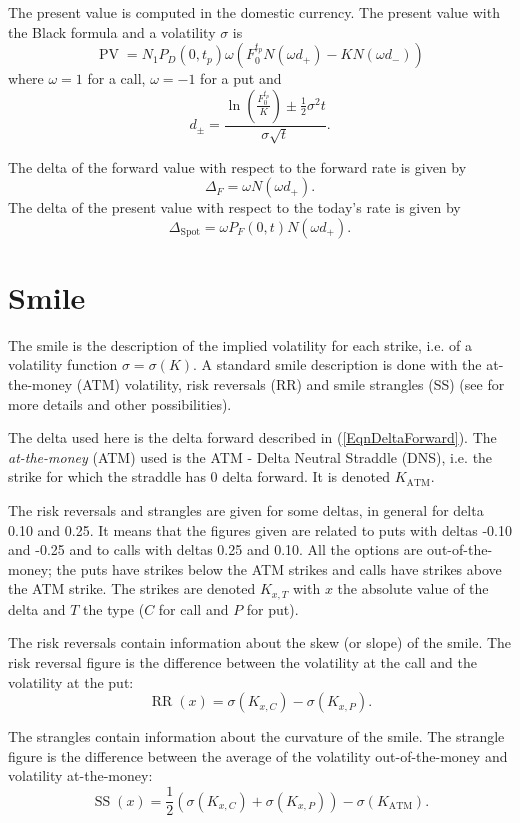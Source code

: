 \documentclass[]{amsart}
\newcommand{\spot}{{\operatorname{Spot}}}
\newcommand{\pv}{{\operatorname{PV}}}
\newcommand{\rr}{{\operatorname{RR}}}
\newcommand{\str}{{\operatorname{SS}}}
\newcommand{\atm}{{\operatorname{ATM}}}
\begin{document}
The present value is computed in the domestic currency.
The present value with the Black formula and a volatility $\sigma$ is
\[
\pv = N_1 P_D(0,t_p) \omega \left( F^{t_p}_0 N(\omega d_+) - K N(\omega d_-)\right)
\]
where $\omega = 1$ for a call, $\omega = -1$ for a put and 
\[
d_{\pm} = \frac{\ln\left(\frac{F^{t_p}_0}{K}\right) \pm \frac12 \sigma^2 t}{ \sigma \sqrt{t}}.
\]

The delta of the forward value with respect to the forward rate is given by
\begin{equation}
\label{EqnDeltaForward}
\Delta_F = \omega N(\omega d_+).
\end{equation}
The delta of the present value with respect to the today's rate is given by
\[
\Delta_\spot = \omega P_F(0,t) N(\omega d_+).
\]

\section{Smile}

The smile is the description of the implied volatility for each strike, i.e. of a volatility function $\sigma = \sigma(K)$.
A standard smile description is done with the at-the-money (ATM) volatility, risk reversals (RR) and smile strangles (SS) (see \cite{CLA.2011.1} for more details and other possibilities).

The delta used here is the delta forward described in (\ref{EqnDeltaForward}).
The \emph{at-the-money} (ATM) used is the ATM - Delta Neutral Straddle (DNS), i.e. the strike for which the straddle has 0 delta forward. It is denoted $K_\atm$.

The risk reversals and strangles are given for some deltas, in general for delta 0.10 and 0.25. It means that the figures given are related to puts with deltas -0.10 and -0.25 and to calls with deltas 0.25 and 0.10. All the options are out-of-the-money; the puts have strikes below the ATM strikes and calls have strikes above the ATM strike. The strikes are denoted $K_{x,T}$ with $x$ the absolute value of the delta and $T$ the type ($C$ for call and $P$ for put).

The risk reversals contain information about the skew (or slope) of the smile. The risk reversal figure is the difference between the volatility at the call and the volatility at the put:
\[
\rr(x) = \sigma(K_{x,C}) - \sigma(K_{x,P}).
\]

The strangles contain information about the curvature of the smile. The strangle figure is the difference between the average of the volatility out-of-the-money and volatility at-the-money:
\[
\str(x) = \frac12 \left(\sigma(K_{x,C}) + \sigma(K_{x,P})\right) - \sigma(K_{\atm}).
\]
\end{document}
